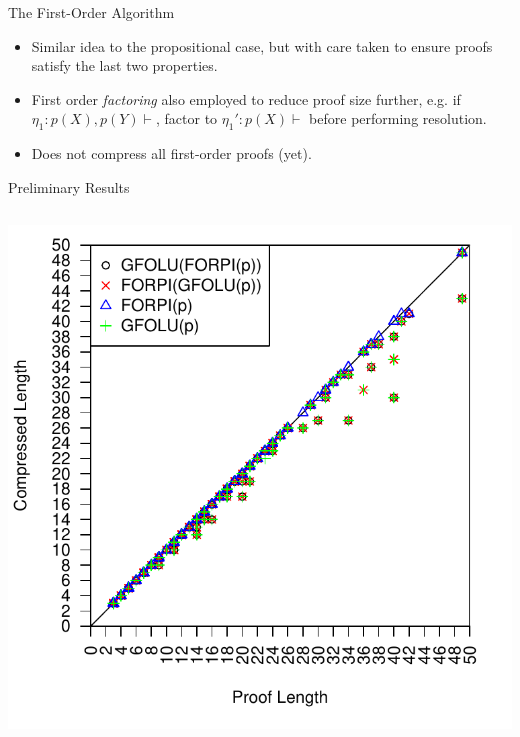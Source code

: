 \documentclass[final]{beamer} %
\begin{document}
\begin{frame}{}
\begin{columns}
\begin{column}{0.48\textwidth}
\begin{block}{The First-Order Algorithm}
\begin{itemize}
\item Similar idea to the propositional case, but with care taken to ensure proofs satisfy the last two properties.
\item First order \emph{factoring} also employed to reduce proof size further, e.g. if $\eta_1: p(X), p(Y) \vdash$, factor to $\eta_1': p(X)\vdash$ before performing resolution.
\item Does not compress all first-order proofs (yet).
\end{itemize}
\end{block}      
      \begin{block}{Preliminary Results}
      \begin{columns}
      \begin{column}{0.35\textwidth}
\includegraphics[scale=1]{images/everything-forpi-folu-length_vs_compress_length_all_proofs.pdf}\\

\end{column}
\end{columns}
\end{block}
\end{column}
\end{columns}
\end{frame}
\end{document}
